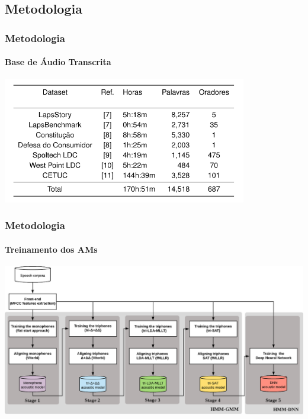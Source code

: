 \subsection{Metodologia}


\begin{frame}
    \frametitle{Metodologia}
    \framesubtitle{Base de \'Audio Transcrita}
    \begin{center}
        \includegraphics[width=0.8\textwidth]{Figures/db}
    \end{center}
\end{frame}

\begin{frame}
    \frametitle{Metodologia}
    \framesubtitle{Treinamento dos AMs}
    \begin{center}
        \includegraphics[width=1\textwidth]{Figures/kaldi_pipeline}
    \end{center}
\end{frame}

